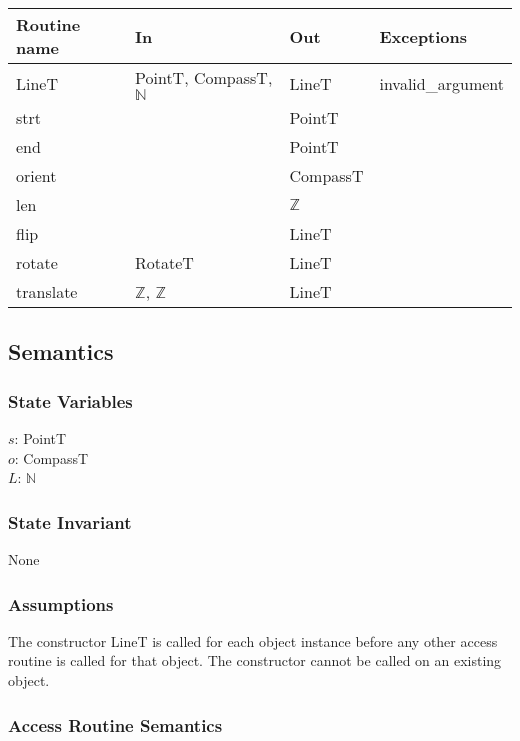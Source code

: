\documentclass[12pt]{article}
\begin{document}
\begin{tabular}{| l | l | l | l |}
\hline
\textbf{Routine name} & \textbf{In} & \textbf{Out} & \textbf{Exceptions}\\
\hline
LineT & PointT, CompassT, $\mathbb{N}$ & LineT & invalid\_argument\\
\hline
strt & ~ & PointT & ~\\
\hline
end & ~ & PointT & ~\\
\hline
orient & ~ & CompassT & ~\\
\hline
 len & ~ & $\mathbb{Z}$ & ~\\
\hline
flip & ~ & LineT & ~\\
\hline
rotate & RotateT & LineT & ~\\
\hline
translate & $\mathbb{Z}$, $\mathbb{Z}$ & LineT  & ~\\
\hline
\end{tabular}

\subsection* {Semantics}

\subsubsection* {State Variables}

$s$: PointT\\
$o$: CompassT\\
$L$: $\mathbb{N}$\\ 

\subsubsection* {State Invariant}

None

\subsubsection* {Assumptions}

The constructor LineT is called for each object instance before any other
access routine is called for that object.  The constructor cannot be called on
an existing object.

\subsubsection* {Access Routine Semantics}
\end{document}
